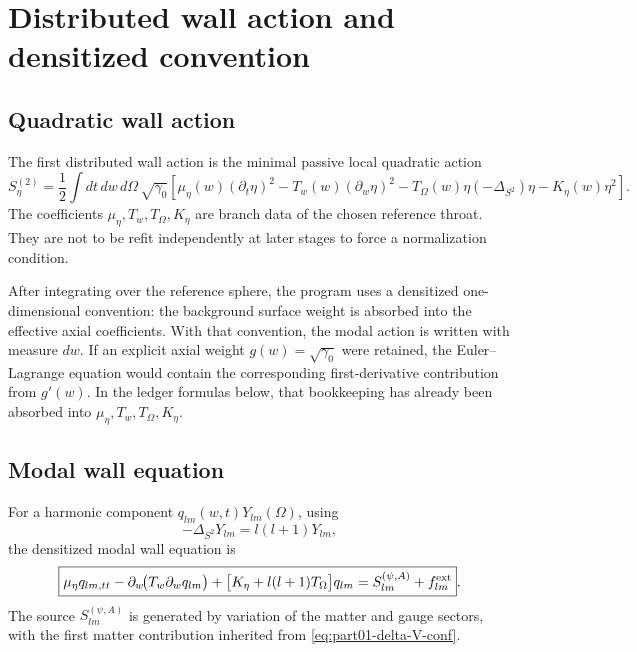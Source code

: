 \section{Distributed wall action and densitized convention}
\label{sec:part01_parent_geometry:distributed-wall-action-and-densitized-convention}

\subsection{Quadratic wall action}
\label{subsec:part01-quadratic-wall-action}

The first distributed wall action is the minimal passive local quadratic action
\begin{equation}
\label{eq:part01-S-eta-raw}
S_\eta^{(2)}
=
\frac12\int dt\,dw\,d\Omega\,\sqrt{\gamma_0}\left[
\mu_\eta(w)(\partial_t\eta)^2
-T_w(w)(\partial_w\eta)^2
-T_\Omega(w)\eta(-\Delta_{S^2})\eta
-K_\eta(w)\eta^2
\right].
\end{equation}
The coefficients \(\mu_\eta,T_w,T_\Omega,K_\eta\) are branch data of the chosen reference throat.  They are not to be refit independently at later stages to force a normalization condition.

After integrating over the reference sphere, the program uses a densitized one-dimensional convention: the background surface weight is absorbed into the effective axial coefficients.  With that convention, the modal action is written with measure \(dw\).  If an explicit axial weight \(g(w)=\sqrt{\gamma_0}\) were retained, the Euler--Lagrange equation would contain the corresponding first-derivative contribution from \(g'(w)\).  In the ledger formulas below, that bookkeeping has already been absorbed into \(\mu_\eta,T_w,T_\Omega,K_\eta\).

\subsection{Modal wall equation}
\label{subsec:part01-modal-wall-equation}

For a harmonic component \(q_{lm}(w,t)Y_{lm}(\Omega)\), using
\begin{equation}
-\Delta_{S^2}Y_{lm}=l(l+1)Y_{lm},
\end{equation}
the densitized modal wall equation is
\begin{equation}
\label{eq:part01-modal-wall-equation}
\boxed{
\mu_\eta q_{lm,tt}
-
\partial_w\!\bigl(T_w\partial_w q_{lm}\bigr)
+
\bigl[K_\eta+l(l+1)T_\Omega\bigr]q_{lm}
=
S_{lm}^{(\psi,A)}+f_{lm}^{\rm ext}}.
\end{equation}
The source \(S_{lm}^{(\psi,A)}\) is generated by variation of the matter and gauge sectors, with the first matter contribution inherited from \eqref{eq:part01-delta-V-conf}.

